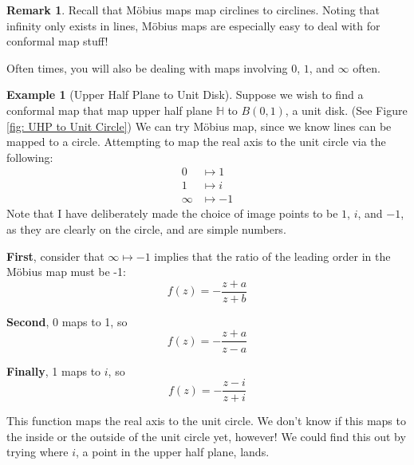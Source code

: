 \documentclass[a4paper, 12pt]{article}
\theoremstyle{definition}
\newtheorem{example}{Example}
\newtheorem{remark}{Remark}
\numberwithin{theorem}{section}
\numberwithin{definition}{section}
\numberwithin{exercise}{section}
\numberwithin{remark}{section}
\numberwithin{figure}{section}
\numberwithin{example}{section}
\begin{document}
\begin{remark}
    Recall that M\"obius maps map circlines to circlines.
    Noting that infinity only exists in lines, M\"obius maps are especially easy to deal with for conformal map stuff!

    Often times, you will also be dealing with maps involving $0$, $1$, and $\infty$ often.
\end{remark}
\begin{example}[Upper Half Plane to Unit Disk]
    Suppose we wish to find a conformal map that map upper half plane $\mathbb{H}$ to $B\left( 0,1 \right)$, a unit disk. (See Figure \ref{fig: UHP to Unit Circle})
    We can try M\"obius map, since we know lines can be mapped to a circle.
    Attempting to map the real axis to the unit circle via the following:
    \begin{align*}
        0 &\mapsto 1 \\
        1 &\mapsto i \\
        \infty &\mapsto -1
    \end{align*}
    Note that I have deliberately made the choice of image points to be $1$, $i$, and $-1$, as they are clearly on the circle,
    and are simple numbers.
    
    \textbf{First}, consider that $\infty \mapsto -1$ implies that the ratio of the leading order in the M\"obius map must be -1:
    \begin{equation*}
        f(z) = -\frac{z + a}{z + b}
    \end{equation*}
    
    \textbf{Second}, 0 maps to 1, so
    \begin{equation*}
        f(z) = -\frac{z + a}{z - a}
    \end{equation*}

    \textbf{Finally}, 1 maps to $i$, so
    \begin{equation*}
        f(z) = -\frac{z - i}{z + i}
    \end{equation*}

    This function maps the real axis to the unit circle.
    We don't know if this maps to the inside or the outside of the unit circle yet, however!
    We could find this out by trying where $i$, a point in the upper half plane, lands.


\end{example}
\end{document}
